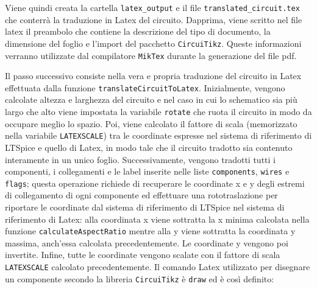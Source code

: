 \noindent
Viene quindi creata la cartella \texttt{latex\_output} e il file \texttt{translated\_circuit.tex} che conterrà la traduzione in Latex del circuito. Dapprima, viene scritto nel file latex il preambolo che contiene la descrizione del tipo di documento, la dimensione del foglio e l'import del pacchetto \texttt{CircuiTikz}. Queste informazioni verranno utilizzate dal compilatore \texttt{MikTex} durante la generazione del file pdf.

\noindent
Il passo successivo consiste nella vera e propria traduzione del circuito in Latex effettuata dalla funzione \texttt{translateCircuitToLatex}. Inizialmente, vengono calcolate altezza e larghezza del circuito e nel caso in cui lo schematico sia più largo che alto viene impostata la variabile \texttt{rotate} che ruota il circuito in modo da occupare meglio lo spazio. Poi, viene calcolato il fattore di scala (memorizzato nella variabile \texttt{LATEXSCALE}) tra le coordinate espresse nel sistema di riferimento di LTSpice e quello di Latex, in modo tale che il circuito tradotto sia contenuto interamente in un unico foglio. Successivamente, vengono tradotti tutti i componenti, i collegamenti e le label inserite nelle liste \texttt{components}, \texttt{wires} e \texttt{flags}; questa operazione richiede di recuperare le coordinate x e y degli estremi di collegamento di ogni componente ed effettuare una rototraslazione per riportare le coordinate dal sistema di riferimento di LTSpice nel sistema di riferimento di Latex: alla coordinata x viene sottratta la x minima calcolata nella funzione \texttt{calculateAspectRatio} mentre alla y viene sottratta la coordinata y massima, anch'essa calcolata precedentemente. Le coordinate y vengono poi invertite. Infine, tutte le coordinate vengono scalate con il fattore di scala \texttt{LATEXSCALE} calcolato precedentemente. Il comando Latex utilizzato per disegnare un componente secondo la libreria \texttt{CircuiTikz} è \texttt{draw} ed è così definito:
